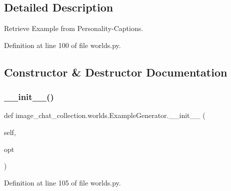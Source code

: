 \subsection{Detailed Description}
\begin{DoxyVerb}Retrieve Example from Personality-Captions.
\end{DoxyVerb}
 

Definition at line 100 of file worlds.\+py.



\subsection{Constructor \& Destructor Documentation}
\mbox{\label{classimage__chat__collection_1_1worlds_1_1ExampleGenerator_a17074787229ef3b12887fa756832d45a}} 
\subsubsection{\texorpdfstring{\+\_\+\+\_\+init\+\_\+\+\_\+()}{\_\_init\_\_()}}
{\footnotesize\ttfamily def image\+\_\+chat\+\_\+collection.\+worlds.\+Example\+Generator.\+\_\+\+\_\+init\+\_\+\+\_\+ (\begin{DoxyParamCaption}\item[{}]{self,  }\item[{}]{opt }\end{DoxyParamCaption})}



Definition at line 105 of file worlds.\+py.



